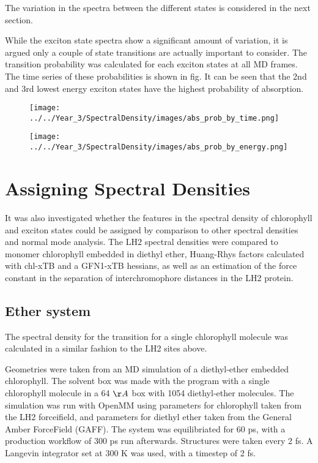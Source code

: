 The variation in the spectra between the different states is considered in the next
section.

\label{subsubsec:Absorption Probability}

While the exciton state spectra show a significant amount of variation, it is argued
only a couple of state transitions are actually important to consider. The transition
probability was calculated for each exciton states at all MD frames. The time series
of these probabilities is shown in fig. It can be seen that the 2nd and 3rd lowest
energy exciton states have the highest probability of absorption. 

\begin{figure}
    \texttt{[image: ../../Year\_3/SpectralDensity/images/abs\_prob\_by\_time.png]}
\end{figure}

\begin{figure}
    \texttt{[image: ../../Year\_3/SpectralDensity/images/abs\_prob\_by\_energy.png]}
\end{figure}

\section{Assigning Spectral Densities}
\label{sec:monomer_dimer_assign}

It was also investigated whether the features in the spectral density of chlorophyll
and exciton states could be assigned by comparison to other spectral densities and
normal mode analysis. The LH2 spectral densities were compared to monomer chlorophyll 
embedded in diethyl ether, Huang-Rhys factors calculated with chl-xTB and a GFN1-xTB
hessians, as well as an estimation of the force constant in the separation of interchromophore
distances in the LH2 protein. 

\subsection{Ether system}
\label{subsec:specdens_ether}

The spectral density for the \Qy transition for a single chlorophyll molecule was
calculated in a similar fashion to the LH2 sites above. 

Geometries were taken from an MD simulation of a diethyl-ether embedded chlorophyll. 
The solvent box was made with the  program with a single chlorophyll 
molecule in a 64 $\AA{}$ box with 1054 diethyl-ether molecules. The simulation was
run with OpenMM using parameters for chlorophyll taken from the LH2 forceifield,
and parameters for diethyl ether taken from the General Amber ForceField (GAFF).
The system was equilibriated for 60 ps, with a production workflow of 300 ps run 
afterwards. Structures were taken every 2 fs. A Langevin integrator set at 300 K
was used, with a timestep of 2 fs.

